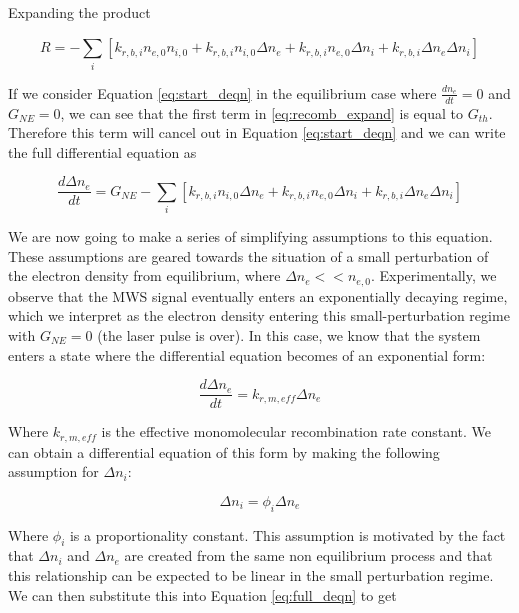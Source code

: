 Expanding the product

\begin{equation}
  \label{eq:recomb_expand}
  R = - \sum_{i}^{}[k_{r, b, i}n_{e,0}n_{i,0}  + k_{r, b, i}n_{i,0}\Delta n_{e} + k_{r, b, i}n_{e,0}\Delta n_{i} + k_{r, b, i}\Delta n_{e}\Delta n_{i}]
\end{equation}


If we consider Equation \ref{eq:start_deqn} in the equilibrium case where $\frac{dn_{e}}{dt} = 0$ and $G_{NE} = 0$, we can see that the first term in \ref{eq:recomb_expand} is equal to $G_{th}$. Therefore this term will cancel out in Equation \ref{eq:start_deqn} and we can write the full differential equation as

\begin{equation}
  \label{eq:full_deqn}
\frac{d\Delta n_{e}}{dt} = G_{NE}  -  \sum_{i}^{}[k_{r, b, i}n_{i,0}\Delta n_{e} + k_{r, b, i}n_{e,0}\Delta n_{i} + k_{r, b, i}\Delta n_{e}\Delta n_{i}]
\end{equation}

We are now going to make a series of simplifying assumptions to this equation. These assumptions are geared towards the situation of a small perturbation of the electron density from equilibrium, where $\Delta n_{e} << n_{e,0}$. Experimentally, we observe that the MWS signal eventually enters an exponentially decaying regime, which we interpret as the electron density entering this small-perturbation regime with $G_{NE} =0$ (the laser pulse is over). In this case, we know that the system enters a state where the differential equation becomes of an exponential form:

\begin{equation}
  \label{eq:small_pert_diffeq}
\frac{d\Delta n_{e}}{dt} = k_{r,m,eff} \Delta n_{e}
\end{equation}

Where $k_{r,m,eff}$ is the effective monomolecular recombination rate constant. We can obtain a differential equation of this form by making the following assumption for $\Delta n_i$:

\begin{equation}
  \label{eq:phi_def}
\Delta n_i = \phi_i \Delta n_{e}
\end{equation}

Where $\phi_i$ is a proportionality constant. This assumption is motivated by the fact that $\Delta n_i$ and $\Delta n_e$ are created from the same non equilibrium process and that this relationship can be expected to be linear in the small perturbation regime. We can then substitute this into Equation \ref{eq:full_deqn} to get


